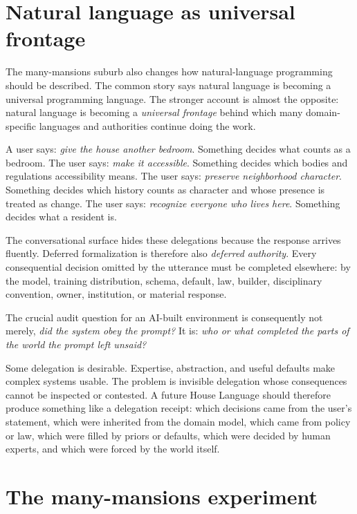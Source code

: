 \documentclass[11pt]{article}
\begin{document}
\section{Natural language as universal frontage}

The many-mansions suburb also changes how natural-language programming should be described. The common story says natural language is becoming a universal programming language. The stronger account is almost the opposite: natural language is becoming a \emph{universal frontage} behind which many domain-specific languages and authorities continue doing the work.

A user says: \emph{give the house another bedroom}. Something decides what counts as a bedroom. The user says: \emph{make it accessible}. Something decides which bodies and regulations accessibility means. The user says: \emph{preserve neighborhood character}. Something decides which history counts as character and whose presence is treated as change. The user says: \emph{recognize everyone who lives here}. Something decides what a resident is.

The conversational surface hides these delegations because the response arrives fluently. Deferred formalization is therefore also \emph{deferred authority}. Every consequential decision omitted by the utterance must be completed elsewhere: by the model, training distribution, schema, default, law, builder, disciplinary convention, owner, institution, or material response.

The crucial audit question for an AI-built environment is consequently not merely, \emph{did the system obey the prompt?} It is: \emph{who or what completed the parts of the world the prompt left unsaid?}

Some delegation is desirable. Expertise, abstraction, and useful defaults make complex systems usable. The problem is invisible delegation whose consequences cannot be inspected or contested. A future House Language should therefore produce something like a delegation receipt: which decisions came from the user's statement, which were inherited from the domain model, which came from policy or law, which were filled by priors or defaults, which were decided by human experts, and which were forced by the world itself.

\section{The many-mansions experiment}
\end{document}
